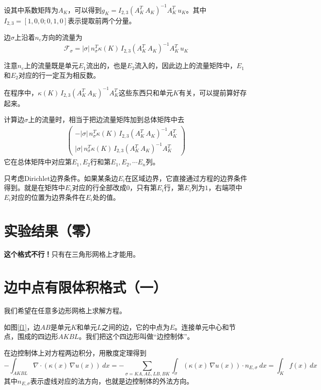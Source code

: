 \documentclass[12pt,a4paper]{article}
\theoremstyle{plain}
\begin{document}
设其中系数矩阵为$A_K$，可以得到$g_K = I_{2,3} (A_K^T \, A_K)^{-1} A_K^T \, u_K$。其中$I_{2,3} = [1,0,0; 0,1,0]$表示提取前两个分量。

边$\sigma$上沿着$n_e$方向的流量为
\begin{equation*}
\mathcal{F}_{\sigma} = |\sigma| \, n_{\sigma}^T \kappa(K) \, I_{2,3} (A_K^T \, A_K)^{-1} A_K^T \, u_K
\end{equation*}

注意$n_e$上的流量既是单元$E_1$流出的，也是$E_2$流入的，因此边上的流量矩阵中，$E_1$和$E_2$对应的行一定互为相反数。

在程序中，$\kappa(K) \, I_{2,3} (A_K^T \, A_K)^{-1} A_K^T$这些东西只和单元$K$有关，可以提前算好存起来。

计算边$\sigma$上的流量时，相当于把边流量矩阵加到总体矩阵中去
\begin{align*}
\left(
\begin{matrix}
- |\sigma| \, n_{\sigma}^T \kappa(K) \, I_{2,3} (A_K^T \, A_K)^{-1} A_K^T \\
|\sigma| \, n_{\sigma}^T \kappa(K) \, I_{2,3} (A_K^T \, A_K)^{-1} A_K^T
\end{matrix}
\right)
\end{align*}
它在总体矩阵中对应第$E_1, E_2$行和第$E_1, E_2, \cdots E_n$列。


只考虑Dirichlet边界条件。如果某条边$E_i$在区域边界，它直接通过方程的边界条件得到。就是在矩阵中$E_i$对应的行全部改成0，只有第$E_i$行，第$E_i$列为$1$，右端项中$E_i$对应的位置为边界条件在$E_i$处的值。


\section*{实验结果（零）}

\textbf{这个格式不行！}只有在三角形网格上才能用。



\section*{边中点有限体积格式（一）}

我们希望在任意多边形网格上求解方程。

如图\ref{f1}，边$AB$是单元$K$和单元$L$之间的边，它的中点为$E$。连接单元中心和节点，围成的四边形$AKBL$。我们把这个四边形叫做“边控制体”。

在边控制体上对方程两边积分，用散度定理得到
\begin{equation*}
- \int_{AKBL} \nabla \cdot (\kappa(x) \, \nabla u(x)) \ dx = - \sum_{\sigma = KA, AL, LB, BK} \int_{\sigma} (\kappa(x) \, \nabla u(x)) \cdot n_{E, \sigma} \ dx = \int_{K} f(x) \ dx
\end{equation*}
其中$n_{E, \sigma}$表示虚线对应的法方向，也就是边控制体的外法方向。
\end{document}
